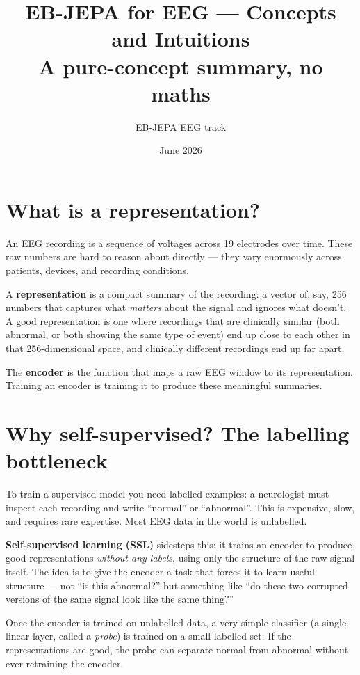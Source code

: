 \documentclass[11pt,a4paper]{article}
\title{\textbf{EB-JEPA for EEG — Concepts and Intuitions}\\
\large A pure-concept summary, no maths}
\author{EB-JEPA EEG track}
\date{June 2026}
\begin{document}
\maketitle

\section*{What is a representation?}

An EEG recording is a sequence of voltages across 19 electrodes over time.
These raw numbers are hard to reason about directly — they vary enormously
across patients, devices, and recording conditions.

A \textbf{representation} is a compact summary of the recording: a vector of,
say, 256 numbers that captures what \emph{matters} about the signal and ignores
what doesn't.  A good representation is one where recordings that are clinically
similar (both abnormal, or both showing the same type of event) end up close to
each other in that 256-dimensional space, and clinically different recordings
end up far apart.

The \textbf{encoder} is the function that maps a raw EEG window to its
representation.  Training an encoder is training it to produce these
meaningful summaries.

\section*{Why self-supervised? The labelling bottleneck}

To train a supervised model you need labelled examples: a neurologist must
inspect each recording and write ``normal'' or ``abnormal''.  This is
expensive, slow, and requires rare expertise.  Most EEG data in the world
is unlabelled.

\textbf{Self-supervised learning (SSL)} sidesteps this: it trains an encoder
to produce good representations \emph{without any labels}, using only the
structure of the raw signal itself.  The idea is to give the encoder a task
that forces it to learn useful structure — not ``is this abnormal?'' but
something like ``do these two corrupted versions of the same signal look like
the same thing?''

Once the encoder is trained on unlabelled data, a very simple classifier
(a single linear layer, called a \emph{probe}) is trained on a small
labelled set.  If the representations are good, the probe can separate
normal from abnormal without ever retraining the encoder.
\end{document}
